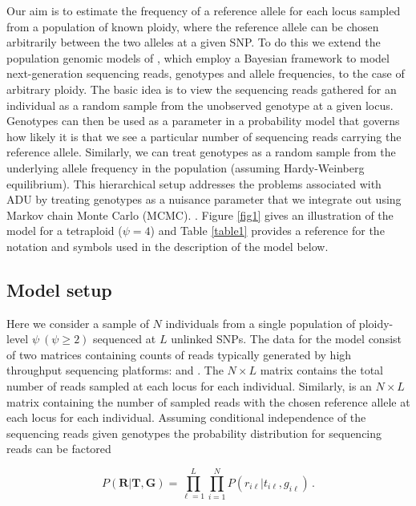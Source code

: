 \documentclass[11pt,english,letterpaper,oneside]{article}
\begin{document}
\noindent Our aim is to estimate the frequency of a reference allele for each locus sampled from a population of known ploidy, where the reference allele can be chosen arbitrarily between the two alleles at a given SNP. To do this we extend the population genomic models of \cite{buerkle2013popModels}, which employ a Bayesian framework to model next-generation sequencing reads, genotypes and allele frequencies, to the case of arbitrary ploidy. The basic idea is to view the sequencing reads gathered for an individual as a random sample from the unobserved genotype at a given locus. Genotypes can then be used as a parameter in a probability model that governs how likely it is that we see a particular number of sequencing reads carrying the reference allele. Similarly, we can treat genotypes as a random sample from the underlying allele frequency in the population (assuming Hardy-Weinberg equilibrium). This hierarchical setup addresses the problems associated with ADU by treating genotypes as a nuisance parameter that we integrate out using Markov chain Monte Carlo (MCMC). . Figure \ref{fig1} gives an illustration of the model for a tetraploid ($\psi=4$) and Table \ref{table1} provides a reference for the notation and symbols used in the description of the model below.

\medskip
\subsection*{Model setup}
\medskip

Here we consider a sample of $N$ individuals from a single population of ploidy-level $\psi\: (\psi\geq2)$ sequenced at $L$ unlinked SNPs. The data for the model consist of two matrices containing counts of reads typically generated by high throughput sequencing platforms: \tmat{} and \rmat. The $N\times L$ matrix \tmat{} contains the total number of reads sampled at each locus for each individual. Similarly, \rmat{} is an $N\times L$ matrix containing the number of sampled reads with the chosen reference allele at each locus for each individual. Assuming conditional independence of the sequencing reads given genotypes the probability distribution for sequencing reads can be factored

\begin{equation}\label{factored_lik}
P(\bm{R}|\bm{T},\bm{G}) = \displaystyle\prod_{\ell=1}^L\displaystyle\prod_{i=1}^N P(r_{i \ell}|t_{i \ell},g_{i \ell})\,.
\end{equation}
\end{document}

